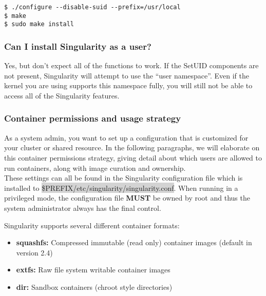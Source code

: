 \documentclass[a4paper]{article}
\newcounter{subsubsubsection}[subsubsection]
\begin{document}
\begin{lstlisting}[frame=single]
$ ./configure --disable-suid --prefix=/usr/local
$ make
$ sudo make install
\end{lstlisting}

\subsubsection{Can I install Singularity as a user?}

Yes, but don’t expect all of the functions to work. If the SetUID components are not present, Singularity will attempt to use the “user namespace”. Even if the kernel you are using supports this namespace fully, you will still not be able to access all of the Singularity features.



\subsubsection{Container permissions and usage strategy}

As a system admin, you want to set up a configuration that is customized for your cluster or shared resource. In the following paragraphs, we will elaborate on this container permissions strategy, giving detail about which users are allowed to run containers, along with image curation and ownership.\\[0.1in]

These settings can all be found in the Singularity configuration file which is installed to \colorbox{lightgray}{\$PREFIX/etc/singularity/singularity.conf}. When running in a privileged mode, the configuration file \textbf{MUST} be owned by root and thus the system administrator always has the final control.




Singularity supports several different container formats:\\[0.1in]

\begin{itemize}
\item \textbf{squashfs:} Compressed immutable (read only) container images (default in version 2.4)
\item \textbf{extfs:} Raw file system writable container images
\item \textbf{dir:} Sandbox containers (chroot style directories)
\end{itemize}
\end{document}
